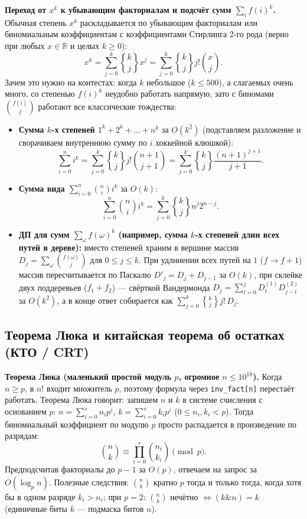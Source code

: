 \documentclass[10pt,a4paper]{article}
\renewcommand{\le}{\leqslant}
\renewcommand{\ge}{\geqslant}
\newcommand{\R}{\mathbb{R}}
\newcommand{\fall}[2]{#1^{\underline{#2}}}
\newcommand{\stirlingsecond}[2]{\genfrac{\{}{\}}{0pt}{}{#1}{#2}}
\begin{document}
\textbf{Переход от $x^k$ к убывающим факториалам и подсчёт сумм $\sum_i f(i)^k$.} Обычная степень $x^k$ раскладывается по убывающим факториалам или биномиальным коэффициентам с коэффициентами Стирлинга 2-го рода (верно при любых $x \in \R$ и целых $k \ge 0$):
\[
  x^k = \sum_{j=0}^{k} \stirlingsecond{k}{j} \fall{x}{j} = \sum_{j=0}^{k} \stirlingsecond{k}{j} j! \binom{x}{j}.
\]
Зачем это нужно на контестах: когда $k$ небольшое ($k \le 500$), а слагаемых очень много, со степенью $f(i)^k$ неудобно работать напрямую, зато с биномами $\binom{f(i)}{j}$ работают все классические тождества:
\begin{itemize}
  \item \textbf{Сумма $k$-х степеней $1^k + 2^k + \dots + n^k$} за $O(k^2)$ (подставляем разложение и сворачиваем внутреннюю сумму по $i$ хоккейной клюшкой):
  \[
    \sum_{i=0}^{n} i^k = \sum_{j=0}^{k} \stirlingsecond{k}{j} j! \binom{n + 1}{j + 1} = \sum_{j=0}^{k} \stirlingsecond{k}{j} \frac{\fall{(n + 1)}{j + 1}}{j + 1}.
  \]
  \item \textbf{Сумма вида $\sum_{i=0}^n \binom{n}{i} i^k$} за $O(k)$:
  \[
    \sum_{i=0}^{n} \binom{n}{i} i^k = \sum_{j=0}^{k} \stirlingsecond{k}{j} \fall{n}{j} 2^{n - j}.
  \]
  \item \textbf{ДП для сумм $\sum_{\omega} f(\omega)^k$ (например, сумма $k$-х степеней длин всех путей в дереве):} вместо степеней храним в вершине массив $D_j = \sum_{\omega} \binom{f(\omega)}{j}$ для $0 \le j \le k$. При удлинении всех путей на $1$ ($f \to f + 1$) массив пересчитывается по Паскалю $D'_j = D_j + D_{j - 1}$ за $O(k)$, при склейке двух поддеревьев ($f_1 + f_2$) — свёрткой Вандермонда $D_j = \sum_{t=0}^j D^{(1)}_t D^{(2)}_{j - t}$ за $O(k^2)$, а в конце ответ собирается как $\sum_{j=0}^k \stirlingsecond{k}{j} j! \, D_j$.
\end{itemize}

\subsection{Теорема Люка и китайская теорема об остатках (КТО / CRT)}

\textbf{Теорема Люка (маленький простой модуль $p$, огромное $n \le 10^{18}$).} Когда $n \ge p$, в $n!$ входит множитель $p$, поэтому формула через \texttt{inv\_fact[n]} перестаёт работать. Теорема Люка говорит: запишем $n$ и $k$ в системе счисления с основанием $p$: $n = \sum_{i=0}^s n_i p^i$, $k = \sum_{i=0}^s k_i p^i$ ($0 \le n_i, k_i < p$). Тогда биномиальный коэффициент по модулю $p$ просто распадается в произведение по разрядам:
\[
  \binom{n}{k} \equiv \prod_{i=0}^{s} \binom{n_i}{k_i} \pmod p.
\]
Предподсчитав факториалы до $p - 1$ за $O(p)$, отвечаем на запрос за $O(\log_p n)$. Полезные следствия: $\binom{n}{k}$ кратно $p$ тогда и только тогда, когда хотя бы в одном разряде $k_i > n_i$; при $p = 2$: $\binom{n}{k}$ нечётно $\iff (k \mathbin{\&} n) = k$ (единичные биты $k$ — подмаска битов $n$).
\end{document}

